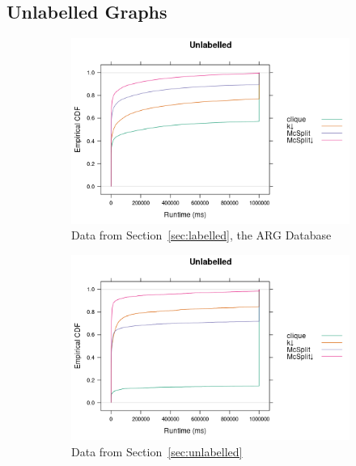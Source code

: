 \documentclass{l4proj}
\theoremstyle{definition}
\theoremstyle{remark}
\begin{document}
\subsection{Unlabelled Graphs}

\begin{figure}
  \centering
  \begin{subfigure}[t]{0.49\textwidth}
    \centering
    \includegraphics[width=\textwidth]{images/ecdf_mcs.png}
    \caption{Data from Section~\ref{sec:labelled}, the ARG Database}
    \label{fig:ecdf_unlabelled_mcs}
  \end{subfigure}
  \begin{subfigure}[t]{0.49\textwidth}
    \centering
    \includegraphics[width=\textwidth]{images/ecdf_sip.png}
    \caption{Data from Section~\ref{sec:unlabelled}}
    \label{fig:ecdf_unlabelled_sip}
  \end{subfigure}
  \begin{subfigure}[t]{\textwidth}

\end{subfigure}
\end{figure}
\end{document}
